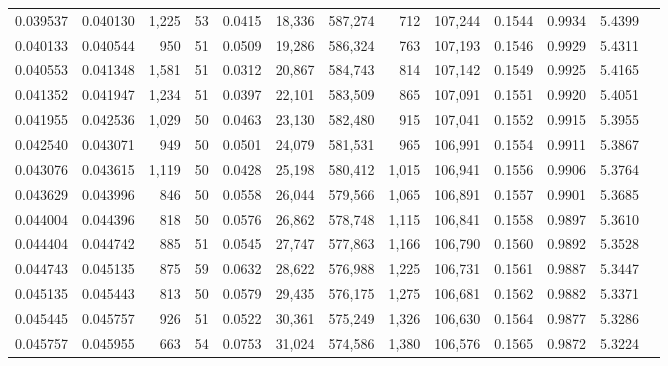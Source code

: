 \begin{tabular}{rrrrrrrrrrrrr}
0.039537 & 0.040130 & 1,225 &  53 &                                     0.0415 &  18,336 & 587,274 &     712 & 107,244 & 0.1544 & 0.9934 & 5.4399 \\
0.040133 & 0.040544 &   950 &  51 &                                     0.0509 &  19,286 & 586,324 &     763 & 107,193 & 0.1546 & 0.9929 & 5.4311 \\
0.040553 & 0.041348 & 1,581 &  51 &                                     0.0312 &  20,867 & 584,743 &     814 & 107,142 & 0.1549 & 0.9925 & 5.4165 \\
0.041352 & 0.041947 & 1,234 &  51 &                                     0.0397 &  22,101 & 583,509 &     865 & 107,091 & 0.1551 & 0.9920 & 5.4051 \\
0.041955 & 0.042536 & 1,029 &  50 &                                     0.0463 &  23,130 & 582,480 &     915 & 107,041 & 0.1552 & 0.9915 & 5.3955 \\
0.042540 & 0.043071 &   949 &  50 &                                     0.0501 &  24,079 & 581,531 &     965 & 106,991 & 0.1554 & 0.9911 & 5.3867 \\
0.043076 & 0.043615 & 1,119 &  50 &                                     0.0428 &  25,198 & 580,412 &   1,015 & 106,941 & 0.1556 & 0.9906 & 5.3764 \\
0.043629 & 0.043996 &   846 &  50 &                                     0.0558 &  26,044 & 579,566 &   1,065 & 106,891 & 0.1557 & 0.9901 & 5.3685 \\
0.044004 & 0.044396 &   818 &  50 &                                     0.0576 &  26,862 & 578,748 &   1,115 & 106,841 & 0.1558 & 0.9897 & 5.3610 \\
0.044404 & 0.044742 &   885 &  51 &                                     0.0545 &  27,747 & 577,863 &   1,166 & 106,790 & 0.1560 & 0.9892 & 5.3528 \\
0.044743 & 0.045135 &   875 &  59 &                                     0.0632 &  28,622 & 576,988 &   1,225 & 106,731 & 0.1561 & 0.9887 & 5.3447 \\
0.045135 & 0.045443 &   813 &  50 &                                     0.0579 &  29,435 & 576,175 &   1,275 & 106,681 & 0.1562 & 0.9882 & 5.3371 \\
0.045445 & 0.045757 &   926 &  51 &                                     0.0522 &  30,361 & 575,249 &   1,326 & 106,630 & 0.1564 & 0.9877 & 5.3286 \\
0.045757 & 0.045955 &   663 &  54 &                                     0.0753 &  31,024 & 574,586 &   1,380 & 106,576 & 0.1565 & 0.9872 & 5.3224 \\

\end{tabular}
